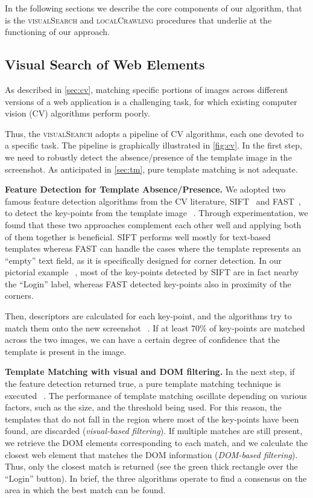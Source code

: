 In the following sections we describe the core components of our algorithm, that is the \textsc{visualSearch} and \textsc{localCrawling} procedures that underlie at the functioning of our approach.

\subsection{Visual Search of Web Elements}

As described in \autoref{sec:cv}, matching specific portions of images across different versions of a web application is a challenging task, for which existing computer vision (CV) algorithms perform poorly. 

Thus, the \textsc{visualSearch} adopts a pipeline of CV algorithms, each one devoted to a specific task. The pipeline is graphically illustrated in \autoref{fig:cv}. In the first step, we need to robustly detect the absence/presence of the template image in the screenshot. As anticipated in \autoref{sec:tm}, pure template matching is not adequate. %

\noindent
\textbf{Feature Detection for Template Absence/Presence.}
We adopted two famous feature detection algorithms from the CV literature, SIFT~\cite{Lowe1999,Lowe2004} and FAST~\cite{rosten2005tracking,rosten2008faster}, to detect the key-points from the template image~\textcircled{}. Through experimentation, we found that these two approaches complement each other well and applying both of them together is beneficial. SIFT performs well mostly for text-based templates whereas FAST can handle the cases where the template represents an ``empty'' text field, as it is specifically designed for corner detection. In our pictorial example~\textcircled{}, most of the key-points detected by SIFT are in fact nearby the ``Login'' label, whereas FAST detected key-points also in proximity of the corners.
 
Then, descriptors are calculated for each key-point, and the algorithms try to match them onto the new screenshot~\textcircled{}.
If at least 70\% of key-points are matched across the two images, we can have a certain degree of confidence that the template is present in the image. 

\noindent
\textbf{Template Matching with visual and DOM filtering.}
In the next step, if the feature detection returned true, a pure template matching technique is executed~\textcircled{}. The performance of template matching oscillate depending on various factors, such as the size, and the threshold being used. For this reason, the templates that do not fall in the region where most of the key-points have been found, are discarded (\textit{visual-based filtering}). If multiple matches are still present, we retrieve the DOM elements corresponding to each match, and we calculate the closest web element that matches the DOM information (\textit{DOM-based filtering}).
Thus, only the closest match is returned (see the green thick rectangle over the ``Login'' button). In brief, the three algorithms operate to find a consensus on the area in which the best match can be found. 

